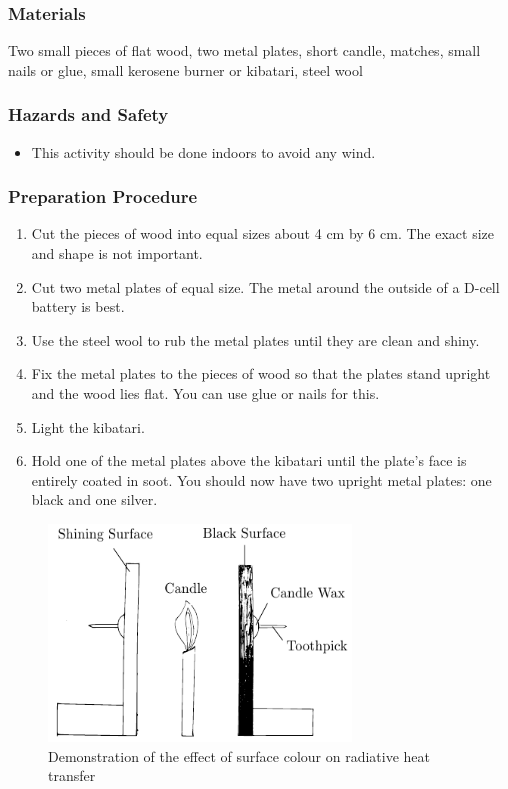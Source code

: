 \subsubsection*{Materials}
Two small pieces of flat wood, two metal plates, short candle, matches, small nails or glue, small kerosene burner or kibatari, steel wool

\subsubsection*{Hazards and Safety}
\begin{itemize}
\item{This activity should be done indoors to avoid any wind.}
\end{itemize}

\subsubsection*{Preparation Procedure}
\begin{enumerate}
\item{Cut the pieces of wood into equal sizes about 4 cm by 6 cm.  The exact size and shape is not important.}
\item{Cut two metal plates of equal size.  The metal around the outside of a D-cell battery is best.}
\item{Use the steel wool to rub the metal plates until they are clean and shiny.}
\item{Fix the metal plates to the pieces of wood so that the plates stand upright and the wood lies flat.  You can use glue or nails for this.}
\item{Light the kibatari.}
\item{Hold one of the metal plates above the kibatari until the plate's face is entirely coated in soot.  You should now have two upright metal plates: one black and one silver.}
\end{enumerate}

\begin{figure}
\begin{center}
\includegraphics{./img/radiation.png}
\caption{Demonstration of the effect of surface colour on radiative heat transfer}
\label{fig:radiation}
\end{center}
\end{figure}

